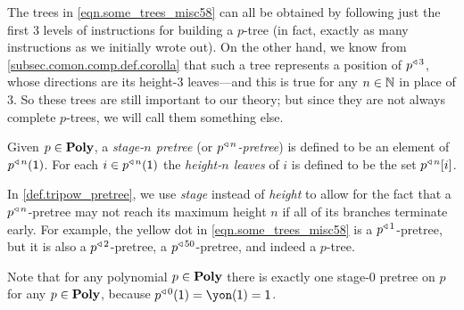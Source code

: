 \documentclass[Book-Poly]{subfiles}
\begin{document}
The trees in \eqref{eqn.some_trees_misc58} can all be obtained by following just the first $3$ levels of instructions for building a $p$-tree (in fact, exactly as many instructions as we initially wrote out).
On the other hand, we know from \cref{subsec.comon.comp.def.corolla} that such a tree represents a position of $p^{\mathbin{\triangleleft}\,3}$, whose directions are its height-$3$ leaves---and this is true for any $n\in\mathbb{N}$ in place of $3$.
So these trees are still important to our theory; but since they are not always complete $p$-trees, we will call them something else.


\begin{definition} \label{def.tripow_pretree}
Given $p\in\mathbf{Poly}$, a \emph{stage-$n$ pretree} (or \emph{$p^{\mathbin{\triangleleft}\,n}$-pretree}) is defined to be an element of $p^{\mathbin{\triangleleft}\,n}(\textsf{1})$. For each $i\in p^{\mathbin{\triangleleft}\,n}(\textsf{1})$ the \emph{height-$n$ leaves} of $i$ is defined to be the set $p^{\mathbin{\triangleleft}\,n}[i]$.
\end{definition}

\begin{remark} \label{rmk.stage}
In \cref{def.tripow_pretree}, we use \emph{stage} instead of \emph{height} to allow for the fact that a $p^{\mathbin{\triangleleft}\,n}$-pretree may not reach its maximum height $n$ if all of its branches terminate early.
For example, the yellow dot in \eqref{eqn.some_trees_misc58} is a $p^{\mathbin{\triangleleft}\,1}$-pretree, but it is also a $p^{\mathbin{\triangleleft}\,2}$-pretree, a $p^{\mathbin{\triangleleft}\,50}$-pretree, and indeed a $p$-tree.

Note that for any polynomial $p\in\mathbf{Poly}$ there is exactly one stage-$0$ pretree on $p$ for any $p\in\mathbf{Poly}$, because $p\tripow0(\1)=\yon(\1)=\1$.
\end{remark}
\end{document}
